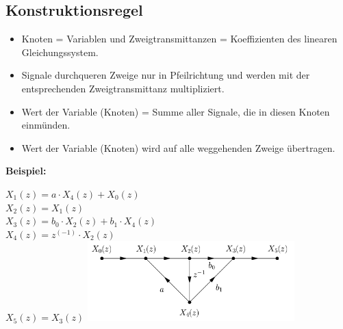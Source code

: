 	\subsection{Konstruktionsregel }
		\begin{itemize}
			\item Knoten = Variablen und Zweigtransmittanzen = Koeffizienten des linearen Gleichungssystem.
			\item Signale durchqueren Zweige nur in Pfeilrichtung und werden mit der entsprechenden Zweigtransmittanz multipliziert.
			\item Wert der Variable (Knoten) = Summe aller Signale, die in diesen Knoten einmünden.
			\item Wert der Variable (Knoten) wird auf alle weggehenden Zweige übertragen.
		\end{itemize}
	
		\textbf{Beispiel:}
		
		\begin{multicols}{2}
			$X_1(z) = a \cdot X_4(z) + X_0(z)$	\\
			$X_2(z) = X_1(z)$	\\
			$X_3(z) = b_0 \cdot X_2(z) + b_1 \cdot X_4(z)$	\\
			$X_4(z) = z^(-1) \cdot X_2(z)$	\\
			$X_5(z) = X_3(z)$
			\vfill
			\columnbreak
			\vfill
			\includegraphics[width=8cm]{./bilder/schleifenkonstruktion_beispiel.png}
		\end{multicols}
	  
